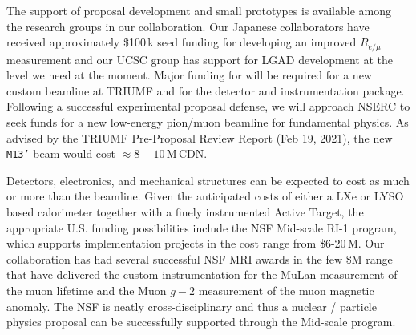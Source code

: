 The support of proposal development and small prototypes is available among the research groups in our collaboration.  Our Japanese collaborators have received approximately \$100\,k
seed funding for developing an improved $R_{e/\mu}$ measurement and our UCSC group has support for LGAD development at the level we need at the moment.
Major funding for \nexp will be required for a new custom beamline at TRIUMF and for the detector and instrumentation package.
Following a successful experimental proposal defense, we  will approach NSERC to seek funds for a new low-energy pion/muon beamline for fundamental physics.
As advised by the TRIUMF Pre-Proposal Review Report (Feb 19, 2021), the new {\tt M13'} beam would cost $\approx 8-10$\,M\,CDN.

Detectors, electronics, and mechanical structures can be expected to cost as much or more than the beamline.  Given the anticipated costs of either a LXe or LYSO based calorimeter together with a finely instrumented Active Target, the appropriate U.S. funding possibilities include the NSF Mid-scale RI-1 program, which supports implementation projects in the cost range from \$6-20\,M.  Our collaboration has had several successful NSF MRI awards in the few \$M range that have delivered the custom instrumentation for the MuLan measurement of the muon lifetime and the Muon $g-2$ measurement of the muon magnetic anomaly.  The NSF is neatly cross-disciplinary and thus a nuclear / particle physics proposal can be successfully supported through the Mid-scale program.
